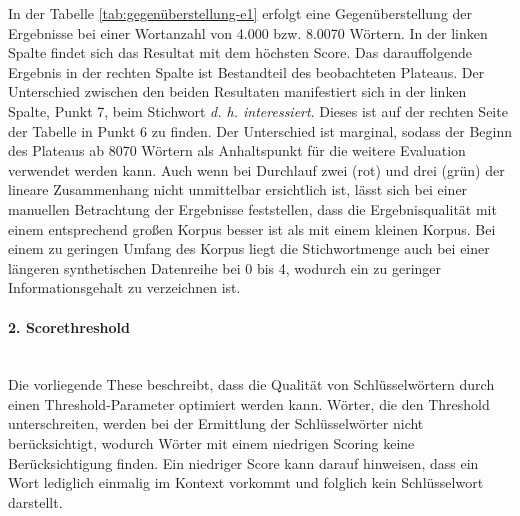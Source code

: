 In der Tabelle \ref{tab:gegenüberstellung-e1} erfolgt eine Gegenüberstellung der Ergebnisse bei einer Wortanzahl von 4.000 bzw. 8.0070 Wörtern. In der linken Spalte findet sich das Resultat mit dem höchsten Score. Das darauffolgende Ergebnis in der rechten Spalte ist Bestandteil des beobachteten Plateaus. Der Unterschied zwischen den beiden Resultaten manifestiert sich in der linken Spalte, Punkt 7, beim Stichwort \emph{d. h. interessiert}. Dieses ist auf der rechten Seite der Tabelle in Punkt 6 zu finden. Der Unterschied ist marginal, sodass der Beginn des Plateaus ab 8070 Wörtern als Anhaltspunkt für die weitere Evaluation verwendet werden kann. Auch wenn bei Durchlauf zwei (rot) und drei (grün) der lineare Zusammenhang nicht unmittelbar ersichtlich ist, lässt sich bei einer manuellen Betrachtung der Ergebnisse feststellen, dass die Ergebnisqualität mit einem entsprechend großen Korpus besser ist als mit einem kleinen Korpus. Bei einem zu geringen Umfang des Korpus liegt die Stichwortmenge auch bei einer längeren synthetischen Datenreihe bei 0 bis 4, wodurch ein zu geringer Informationsgehalt zu verzeichnen ist.
\paragraph{2. Scorethreshold}\mbox{}\\
Die vorliegende These beschreibt, dass die Qualität von Schlüsselwörtern durch einen Threshold-Parameter optimiert werden kann. Wörter, die den Threshold unterschreiten, werden bei der Ermittlung der Schlüsselwörter nicht berücksichtigt, wodurch Wörter mit einem niedrigen Scoring keine Berücksichtigung finden. Ein niedriger Score kann darauf hinweisen, dass ein Wort lediglich einmalig im Kontext vorkommt und folglich kein Schlüsselwort darstellt.\\


